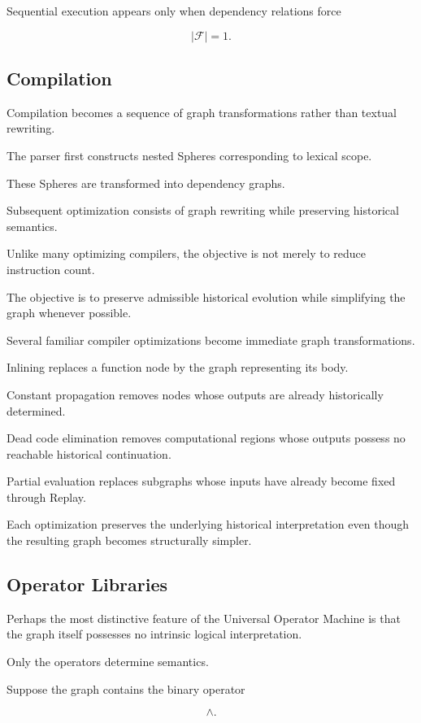 \documentclass[12pt,oneside]{article}
\theoremstyle{definition}
\theoremstyle{remark}
\begin{document}
Sequential execution appears only when dependency relations force

\[
|\mathcal F|=1.
\]

\subsection{Compilation}

Compilation becomes a sequence of graph transformations rather than textual
rewriting.

The parser first constructs nested Spheres corresponding to lexical scope.

These Spheres are transformed into dependency graphs.

Subsequent optimization consists of graph rewriting while preserving
historical semantics.

Unlike many optimizing compilers, the objective is not merely to reduce
instruction count.

The objective is to preserve admissible historical evolution while simplifying
the graph whenever possible.

Several familiar compiler optimizations become immediate graph
transformations.

Inlining replaces a function node by the graph representing its body.

Constant propagation removes nodes whose outputs are already historically
determined.

Dead code elimination removes computational regions whose outputs possess no
reachable historical continuation.

Partial evaluation replaces subgraphs whose inputs have already become fixed
through Replay.

Each optimization preserves the underlying historical interpretation even
though the resulting graph becomes structurally simpler.

\subsection{Operator Libraries}

Perhaps the most distinctive feature of the Universal Operator Machine is that
the graph itself possesses no intrinsic logical interpretation.

Only the operators determine semantics.

Suppose the graph contains the binary operator

\[
\land.
\]
\end{document}
